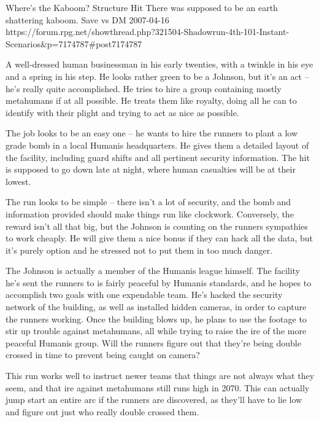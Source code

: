 \begin{scenario}{Where’s the Kaboom?}
	{Structure Hit}
	{There was supposed to be an earth shattering kaboom.}
	{Save vs DM}
	{2007-04-16}
	{https://forum.rpg.net/showthread.php?321504-Shadowrun-4th-101-Instant-Scenarios\&p=7174787#post7174787}

 A well-dressed human businessman in his early twenties, with a twinkle in his eye and a spring in his step. He looks rather green to be a Johnson, but it’s an act – he’s really quite accomplished. He tries to hire a group containing mostly metahumans if at all possible. He treats them like royalty, doing all he can to identify with their plight and trying to act as nice as possible.

\synopsis The job looks to be an easy one – he wants to hire the runners to plant a low grade bomb in a local Humanis headquarters. He gives them a detailed layout of the facility, including guard shifts and all pertinent security information. The hit is supposed to go down late at night, where human casualties will be at their lowest.

The run looks to be simple – there isn’t a lot of security, and the bomb and information provided should make things run like clockwork. Conversely, the reward isn’t all that big, but the Johnson is counting on the runners sympathies to work cheaply. He will give them a nice bonus if they can hack all the data, but it’s purely option and he stressed not to put them in too much danger.

\twist The Johnson is actually a member of the Humanis league himself. The facility he’s sent the runners to is fairly peaceful by Humanis standards, and he hopes to accomplish two goals with one expendable team. He’s hacked the security network of the building, as well as installed hidden cameras, in order to capture the runners working. Once the building blows up, he plans to use the footage to stir up trouble against metahumans, all while trying to raise the ire of the more peaceful Humanis group. Will the runners figure out that they’re being double crossed in time to prevent being caught on camera?

\notes This run works well to instruct newer teams that things are not always what they seem, and that ire against metahumans still runs high in 2070. This can actually jump start an entire arc if the runners are discovered, as they’ll have to lie low and figure out just who really double crossed them.

\end{scenario}